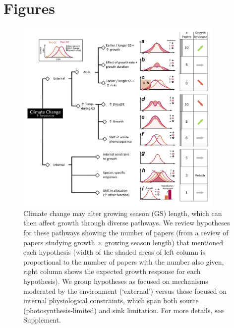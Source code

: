 \documentclass[11pt]{article}
\begin{document}
\clearpage
\section{Figures}

\begin{figure}[h!]
\includegraphics[width=0.9\textwidth]{..//figures/_figuresFromRuben/conceptual.png}
\caption{Climate change may alter growing season (GS) length, which can then affect growth through diverse pathways. We review hypotheses for these pathways showing the number of papers (from a review of papers studying growth $\times$ growing season length) that mentioned each hypothesis (width of the shaded areas of left column is proportional to the number of papers with the number also given, right column shows the expected growth response for each hypothesis). We group hypotheses as focused on mechanisms moderated by the environment (`external') versus those focused on internal physiological constraints, which span both source (photosynthesis-limited) and sink limitation. For more details, see Supplement.} 
\label{fig:hypotheses}
\end{figure}
\end{document}
